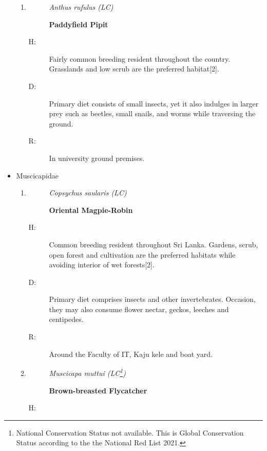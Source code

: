 \begin{itemize}
\begin{enumerate}
\item%
\begin{description}%
\item[]%
\textit{Anthus rufulus (LC)}%
\item[]%
\textbf{Paddyfield Pipit}%
\end{description}%
\begin{description}%
\item[H: ]%
Fairly common breeding resident throughout the country. Grasslands and low scrub are the preferred habitat{[}2{]}.%
\item[D: ]%
Primary diet consists of small insects, yet it also indulges in larger prey such as beetles, small snails, and worms while traversing the ground. %
\item[R: ]%
In university ground premises.%
\end{description}%
\end{enumerate}%
\item%
Muscicapidae%
\begin{enumerate}%
\item%
\begin{description}%
\item[]%
\textit{Copsychus saularis (LC)}%
\item[]%
\textbf{Oriental Magpie{-}Robin}%
\end{description}%
\begin{description}%
\item[H: ]%
Common breeding resident throughout Sri Lanka. Gardens, scrub, open forest and cultivation are the preferred habitats while avoiding interior of wet forests{[}2{]}.%
\item[D: ]%
Primary diet comprises insects and other invertebrates. Occasion, they may also consume flower nectar, geckos, leeches and centipedes.%
\item[R: ]%
Around the Faculty of IT, Kaju kele and boat yard.%
\end{description}%
\item%
\begin{description}%
\item[]%
\textit{Muscicapa muttui (LC\footnote{National Conservation Status not available. This is Global Conservation Status according to the the National Red List 2021.})}%
\item[]%
\textbf{Brown{-}breasted Flycatcher}%
\end{description}%
\begin{description}%
\item[H: ]%

\end{description}
\end{enumerate}
\end{itemize}
